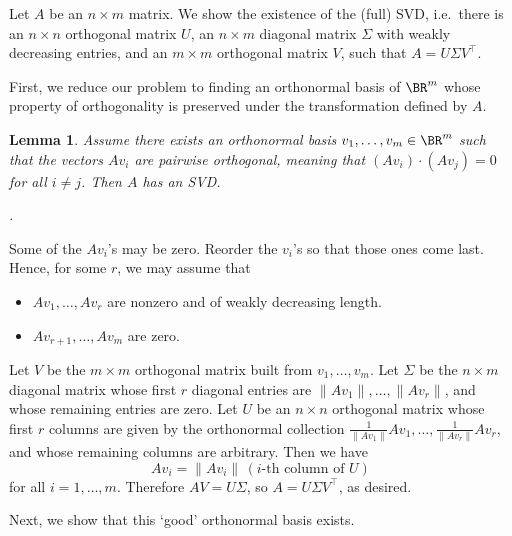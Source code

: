 \documentclass[10pt]{amsart}
\makeatletter
\renewenvironment{proof}[1][\proofname]{\par
	\pushQED{\qed}%
	\normalfont \topsep6\p@\@plus6\p@\relax
	\noindent\emph{#1.} 
	\ignorespaces
}{%
\popQED\endtrivlist\@endpefalse
}
\theoremstyle{mythm}
\newtheorem{lem}[thm]{Lemma}
\theoremstyle{definition}
\theoremstyle{myrmk}
\makeatother
\begin{document}
	\thispagestyle{fancy}
	
	Let $A$ be an $n \times m$ matrix. We show the existence of the (full) SVD, i.e.\ there is an $n \times n$ orthogonal matrix $U$, an $n \times m$ diagonal matrix $\Sigma$ with weakly decreasing entries, and an $m \times m$ orthogonal matrix $V$, such that $A = U\Sigma V^\top$. 
	
	First, we reduce our problem to finding an orthonormal basis of $\BR^m$ whose property of orthogonality is preserved under the transformation defined by $A$. 
	
	\begin{lem}
		Assume there exists an orthonormal basis $v_1, \ldots, v_m \in \BR^m$ such that the vectors $Av_i$ are pairwise orthogonal, meaning that $(Av_i) \cdot (Av_j) = 0$ for all $i \neq j$. Then $A$ has an SVD. 
	\end{lem}
	\begin{proof}
		Some of the $Av_i$'s may be zero. Reorder the $v_i$'s so that those ones come last. Hence, for some $r$, we may assume that 
		\begin{itemize}
			\item $Av_1, \ldots, Av_r$ are nonzero and of weakly decreasing length. 
			\item $Av_{r+1}, \ldots, Av_m$ are zero. 
		\end{itemize}
		Let $V$ be the $m \times m$ orthogonal matrix built from $v_1, \ldots, v_m$. Let $\Sigma$ be the $n \times m$ diagonal matrix whose first $r$ diagonal entries are $\lVert Av_1\rVert, \ldots, \lVert Av_r\rVert$, and whose remaining entries are zero. Let $U$ be an $n \times n$ orthogonal matrix whose first $r$ columns are given by the orthonormal collection $\frac{1}{\lVert Av_1\rVert} Av_1, \ldots, \frac{1}{\lVert Av_r\rVert} Av_r$, and whose remaining columns are arbitrary. Then we have 
		\[
			Av_i = \lVert Av_i \rVert \, (i\text{-th column of } U)
		\]
		for all $i = 1, \ldots, m$. Therefore $AV = U \Sigma$, so $A = U \Sigma V^\top$, as desired. 
	\end{proof}
	
	Next, we show that this `good' orthonormal basis exists. 
	
\end{document}

